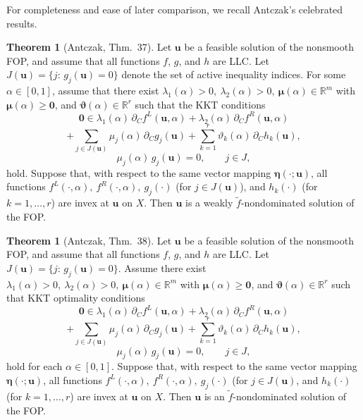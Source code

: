 \documentclass{article}
\theoremstyle{definition}
\newtheorem{theorem}[maar]{Theorem}
\begin{document}
For completeness and ease of later comparison, we recall  Antczak's celebrated results.
\begin{theorem}[Antczak, Thm.~37]\label{thm:Ant37}
Let $\boldsymbol u$ be a feasible solution of the nonsmooth FOP, and assume that all functions $f$, $g$, and $h$ are LLC.
Let $J(\boldsymbol u)=\{j\!\!:\,g_j(\boldsymbol u)=0\}$ denote the set of active
inequality indices. For some $\alpha\in[0,1]$, assume that there exist
$\lambda_1(\alpha)>0,\ \lambda_2(\alpha)>0,\ 
{\boldsymbol\mu}(\alpha)\in\mathbb R^m$ with
${\boldsymbol\mu}(\alpha)\ge \boldsymbol 0$, and
${\boldsymbol\vartheta}(\alpha)\in\mathbb R^r$ such that the KKT conditions
\[
\boldsymbol 0 \in
\lambda_1(\alpha)\,\partial_C f^{L}(\boldsymbol u,\alpha)
+ \lambda_2(\alpha)\,\partial_C f^{R}(\boldsymbol u,\alpha)\]
\[+ \sum_{j\in J(\boldsymbol u)} \mu_j(\alpha)\,\partial_C g_j(\boldsymbol u)
+ \sum_{k=1}^r \vartheta_k(\alpha)\,\partial_C h_k(\boldsymbol u),
\]
\[
\mu_j(\alpha)\,g_j(\boldsymbol u)=0,\qquad j\in J,
\]
hold. Suppose that, with respect to the same vector mapping
$\boldsymbol\eta(\cdot;\boldsymbol u)$, all functions 
$f^{L}(\cdot,\alpha),\ f^{R}(\cdot,\alpha),\ g_j(\cdot)$ (for $j\in J(\boldsymbol u)$),
and $h_k(\cdot)$ (for $k=1,\dots,r$) are invex at $\boldsymbol u$ on $X$.
Then $\boldsymbol u$ is a weakly $\tilde f$-nondominated solution of the FOP.
\end{theorem}
\begin{theorem}[Antczak, Thm.~38]\label{thm:Ant38}
Let $\boldsymbol u$ be a feasible solution of the nonsmooth FOP,
and assume that all functions $f$, $g$, and $h$ are LLC.
Let $J(\boldsymbol u)=\{j\!\!:\,g_j(\boldsymbol u)=0\}$. Assume there exist
$\lambda_1(\alpha)>0,\ \lambda_2(\alpha)>0,\ 
{\boldsymbol\mu}(\alpha)\in\mathbb R^{m}$ with
${\boldsymbol\mu}(\alpha)\ge \boldsymbol 0$, and
${\boldsymbol\vartheta}(\alpha)\in\mathbb R^r$ such that KKT optimality conditions
\[
\boldsymbol 0 \in
\lambda_1(\alpha)\,\partial_C f^{L}(\boldsymbol u,\alpha)
+ \lambda_2(\alpha)\,\partial_C f^{R}(\boldsymbol u,\alpha)\]
\[+ \sum_{j\in J(\boldsymbol u)} \mu_j(\alpha)\,\partial_C g_j(\boldsymbol u)
+ \sum_{k=1}^r \vartheta_k(\alpha)\,\partial_C h_k(\boldsymbol u),
\]
\[
\mu_j(\alpha)\,g_j(\boldsymbol u)=0,\qquad j\in J,
\]
hold for each  $\alpha\in[0,1]$.
Suppose that, with respect to the same vector mapping
$\boldsymbol\eta(\cdot;\boldsymbol u)$, all functions 
$f^{L}(\cdot,\alpha),\ f^{R}(\cdot,\alpha),\ g_j(\cdot)$ (for $j\in J(\boldsymbol u)$,
and $h_k(\cdot)$ (for $k=1,\dots,r$) are invex at $\boldsymbol u$ on $X$.
Then $\boldsymbol u$ is an $\tilde f$-nondominated solution of the FOP.
\end{theorem}
\end{document}
